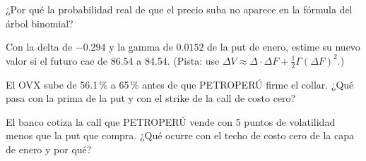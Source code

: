 \ejercicio[conceptual] ¿Por qué la probabilidad real de que el precio suba no aparece en la fórmula del árbol binomial?

\ejercicio[cálculo] Con la delta de $-0.294$ y la gamma de $0.0152$ de la put de enero, estime su nuevo valor si el futuro cae de 86.54 a 84.54. (Pista: use $\Delta V\approx\Delta\cdot\Delta F+\tfrac12\Gamma(\Delta F)^2$.)

\ejercicio[conceptual] El OVX sube de 56.1\,\% a 65\,\% antes de que PETROPERÚ firme el collar. ¿Qué pasa con la prima de la put y con el strike de la call de costo cero?

\ejercicio[conceptual] El banco cotiza la call que PETROPERÚ vende con 5 puntos de volatilidad menos que la put que compra. ¿Qué ocurre con el techo de costo cero de la capa de enero y por qué?

